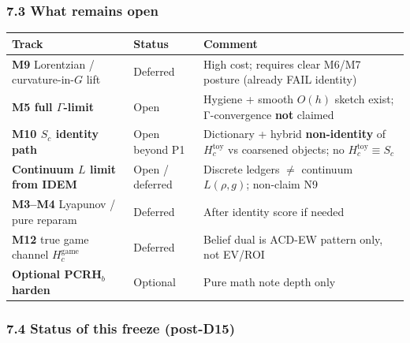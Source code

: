 \documentclass[
  11pt,
]{article}
\newcounter{none} %
\begin{document}
\subsubsection{7.3 What remains open}\label{what-remains-open}

{\def\LTcaptype{none} %
\begin{longtable}[]{@{}
  >{\raggedright\arraybackslash}p{}
  >{\raggedright\arraybackslash}p{}
  >{\raggedright\arraybackslash}p{}@{}}
\toprule\noalign{}
\begin{minipage}[b]{\linewidth}\raggedright
Track
\end{minipage} & \begin{minipage}[b]{\linewidth}\raggedright
Status
\end{minipage} & \begin{minipage}[b]{\linewidth}\raggedright
Comment
\end{minipage} \\
\midrule\noalign{}
\endhead
\bottomrule\noalign{}
\endlastfoot
\textbf{M9} Lorentzian / curvature-in-\(G\) lift & Deferred & High cost;
requires clear M6/M7 posture (already FAIL identity) \\
\textbf{M5 full \(\Gamma\)-limit} & Open & Hygiene + smooth \(O(h)\)
sketch exist; Γ-convergence \textbf{not} claimed \\
\textbf{M10 \(S_c\) identity path} & Open beyond P1 & Dictionary +
hybrid \textbf{non-identity} of \(H_c^{\mathrm{toy}}\) vs coarsened
objects; no \(H_c^{\mathrm{toy}}\equiv S_c\) \\
\textbf{Continuum \(L\) limit from IDEM} & Open / deferred & Discrete
ledgers $\neq$ continuum \(L(\rho,g)\); non-claim N9 \\
\textbf{M3--M4} Lyapunov / pure reparam & Deferred & After identity
score if needed \\
\textbf{M12} true game channel \(H_c^{\mathrm{game}}\) & Deferred &
Belief dual is ACD-EW pattern only, not EV/ROI \\
\textbf{Optional PCRH\(_b\) harden} & Optional & Pure math note depth
only \\
\end{longtable}
}

\subsubsection{7.4 Status of this freeze
(post-D15)}\label{status-of-this-freeze-post-d15}
\end{document}
